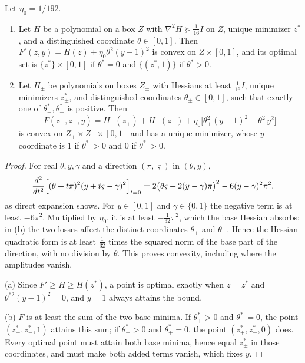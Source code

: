 \begin{lemma}\label{lem:points-amplifier}
Let $\eta_0=1/192$.
\begin{enumerate}[label=(\alph*)]
\item Let $H$ be a polynomial on a box $Z$ with $\nabla^2H\succeq\frac1{16}I$
on $Z$, unique minimizer $z^*$, and a distinguished coordinate
$\theta\in[0,1]$. Then $F'(z,y)=H(z)+\eta_0\theta^2(y-1)^2$ is convex on
$Z\times[0,1]$, and its optimal set is $\{z^*\}\times[0,1]$ if $\theta^*=0$
and $\{(z^*,1)\}$ if $\theta^*>0$.
\item Let $H_\pm$ be polynomials on boxes $Z_\pm$ with Hessians at least
$\frac1{16}I$, unique minimizers $z_\pm^*$, and distinguished coordinates
$\theta_\pm\in[0,1]$, such that exactly one of $\theta_+^*,\theta_-^*$ is
positive. Then
\[
 F(z_+,z_-,y)=H_+(z_+)+H_-(z_-)+\eta_0\bigl[\theta_+^2(y-1)^2+
 \theta_-^2y^2\bigr]
\]
is convex on $Z_+\times Z_-\times[0,1]$ and has a unique minimizer, whose
$y$-coordinate is $1$ if $\theta_+^*>0$ and $0$ if $\theta_-^*>0$.
\end{enumerate}
\end{lemma}

\begin{proof}
For real $\theta,y,\gamma$ and a direction $(\pi,\varsigma)$ in
$(\theta,y)$,
\begin{equation}\label{eq:points-amplifier-identity}
 \frac{d^2}{dt^2}\Bigl[(\theta+t\pi)^2(y+t\varsigma-\gamma)^2\Bigr]_{t=0}
 =2\bigl(\theta\varsigma+2(y-\gamma)\pi\bigr)^2-6(y-\gamma)^2\pi^2 ,
\end{equation}
as direct expansion shows. For $y\in[0,1]$ and $\gamma\in\{0,1\}$ the
negative term is at least $-6\pi^2$. Multiplied by $\eta_0$, it is at least
$-\frac1{32}\pi^2$, which the base Hessian absorbs; in (b) the two losses
affect the distinct coordinates $\theta_+$ and $\theta_-$. Hence the Hessian
quadratic form is at least $\frac1{32}$ times the squared norm of the base
part of the direction, with no division by $\theta$. This proves convexity,
including where the amplitudes vanish.

(a) Since $F'\ge H\ge H(z^*)$, a point is optimal exactly when $z=z^*$ and
$\theta^{*2}(y-1)^2=0$, and $y=1$ always attains the bound.

(b) $F$ is at least the sum of the two base minima. If $\theta_+^*>0$ and
$\theta_-^*=0$, the point $(z_+^*,z_-^*,1)$ attains this sum; if
$\theta_-^*>0$ and $\theta_+^*=0$, the point $(z_+^*,z_-^*,0)$ does. Every
optimal point must attain both base minima, hence equal $z_\pm^*$ in those
coordinates, and must make both added terms vanish, which fixes $y$.
\end{proof}

